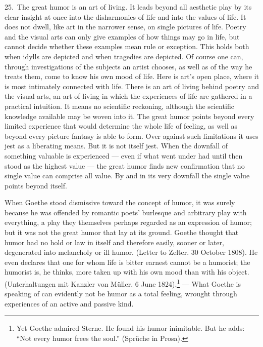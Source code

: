 \documentclass[12pt]{book}
\newcommand{\opage}[1]{\marginnote{\footnotesize\textit{[#1]}}}
\begin{document}
25.~The great humor is an art of living. It leads beyond all aesthetic play by its
clear insight at once into the disharmonies of life and into the values of life. It does
not dwell, like art in the narrower sense, on single pictures of life. Poetry and the
visual arts can only give examples of how things may go in life, but cannot decide
whether these examples mean rule or exception. This holds both when idylls are depicted
and when tragedies are depicted. Of course one can, through investigations of the
subjects an artist chooses, as well as of the way he treats them, come to know his own
mood of life. Here is art's open place, where it is most intimately connected with life.
There is an art of living behind poetry and the visual arts, an art of living in which
the experiences of life are gathered in a practical intuition. It means no scientific
reckoning, although the scientific knowledge available may be woven into it. The great
humor points beyond every limited experience that would determine the whole life of
feeling, as well as beyond every picture fantasy is able to form. Over against such
limitations it uses jest as a liberating means. But it is not itself jest. When the
downfall of something valuable is experienced --- even if what went under had until then
stood as the highest value --- the great humor finds new confirmation that no single
value can comprise all value. By and in its very downfall the single value points beyond
itself.

When Goethe stood dismissive toward the concept of humor, it was surely because he was
offended by romantic poets' burlesque and arbitrary play with everything, a play they
themselves perhaps regarded as an expression of humor; but it was not the great humor
that \opage{93}lay at its ground. Goethe thought that humor had no hold or law in itself
and therefore easily, sooner or later, degenerated into melancholy or ill humor. (Letter
to Zelter. 30 October 1808). He even declares that one for whom life is bitter earnest
cannot be a humorist; the humorist is, he thinks, more taken up with his own mood than
with his object. (Unterhaltungen mit Kanzler von Müller. 6 June 1824).\footnote{Yet
Goethe admired Sterne. He found his humor inimitable. But he adds: ``Not every humor
frees the soul.'' (Sprüche in Prosa).} --- What Goethe is speaking of can evidently not
be humor as a total feeling, wrought through experiences of an active and passive kind.
\end{document}
